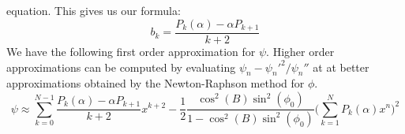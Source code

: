 \documentclass[crop=false,class=book,oneside]{standalone}
\begin{document}
            equation. This gives us our formula:
            \begin{equation*}
                b_{k}=\frac{P_{k}(\alpha)-\alpha{P}_{k+1}}{k+2}
            \end{equation*}
            We have the following first order approximation
            for $\psi$. Higher order approximations can be
            computed by evaluating
            $\psi_{n}-\psi_{n}'^{2}/\psi_{n}''$ at
            at better approximations obtained by the
            Newton-Raphson method for $\phi$.
            \begin{equation*}
                \psi\approx
                \sum_{k=0}^{N-1}
                \frac{P_{k}(\alpha)-\alpha{P}_{k+1}}{k+2}x^{k+2}
                -\frac{1}{2}
                \frac{\cos^{2}(B)\sin^{2}(\phi_{0})}
                     {1-\cos^{2}(B)\sin^{2}(\phi_{0})}
                \Big(\sum_{k=1}^{N}P_{k}(\alpha)x^{n}\Big)^{2}
            \end{equation*}
\end{document}
